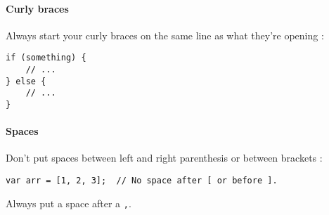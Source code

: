 \paragraph{Curly braces}
Always start your curly braces on the same line as what they're opening :
\begin{lstlisting}
if (something) {
    // ...
} else {
    // ...
}
\end{lstlisting}

\paragraph{Spaces}
Don't put spaces between left and right parenthesis or between brackets :
\begin{lstlisting}
var arr = [1, 2, 3];  // No space after [ or before ].
\end{lstlisting}

Always put a space after a \lstinline{,}.